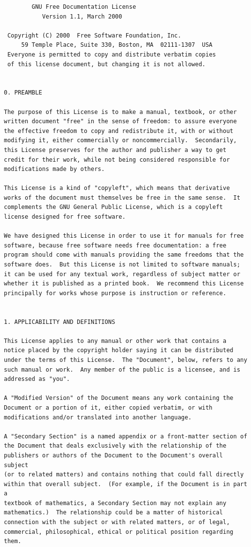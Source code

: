 \documentclass[12pt]{report}
\begin{document}
\begin{verbatim}
		GNU Free Documentation License
		   Version 1.1, March 2000

 Copyright (C) 2000  Free Software Foundation, Inc.
     59 Temple Place, Suite 330, Boston, MA  02111-1307  USA
 Everyone is permitted to copy and distribute verbatim copies
 of this license document, but changing it is not allowed.


0. PREAMBLE

The purpose of this License is to make a manual, textbook, or other
written document "free" in the sense of freedom: to assure everyone
the effective freedom to copy and redistribute it, with or without
modifying it, either commercially or noncommercially.  Secondarily,
this License preserves for the author and publisher a way to get
credit for their work, while not being considered responsible for
modifications made by others.

This License is a kind of "copyleft", which means that derivative
works of the document must themselves be free in the same sense.  It
complements the GNU General Public License, which is a copyleft
license designed for free software.

We have designed this License in order to use it for manuals for free
software, because free software needs free documentation: a free
program should come with manuals providing the same freedoms that the
software does.  But this License is not limited to software manuals;
it can be used for any textual work, regardless of subject matter or
whether it is published as a printed book.  We recommend this License
principally for works whose purpose is instruction or reference.


1. APPLICABILITY AND DEFINITIONS

This License applies to any manual or other work that contains a
notice placed by the copyright holder saying it can be distributed
under the terms of this License.  The "Document", below, refers to any
such manual or work.  Any member of the public is a licensee, and is
addressed as "you".

A "Modified Version" of the Document means any work containing the
Document or a portion of it, either copied verbatim, or with
modifications and/or translated into another language.

A "Secondary Section" is a named appendix or a front-matter section of
the Document that deals exclusively with the relationship of the
publishers or authors of the Document to the Document's overall subject
(or to related matters) and contains nothing that could fall directly
within that overall subject.  (For example, if the Document is in part a
textbook of mathematics, a Secondary Section may not explain any
mathematics.)  The relationship could be a matter of historical
connection with the subject or with related matters, or of legal,
commercial, philosophical, ethical or political position regarding
them.


\end{verbatim}
\end{document}
